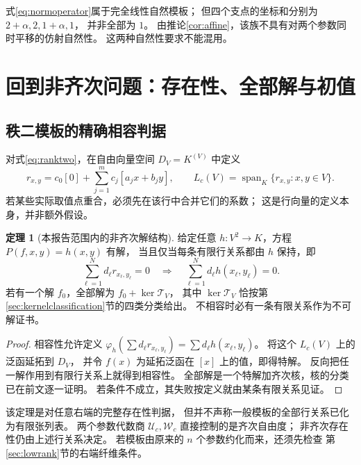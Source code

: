 \documentclass[UTF8,11pt,a4paper]{ctexart}
\theoremstyle{definition}
\newtheorem{theorem}{定理}[section]
\newcommand{\Span}{\operatorname{span}}
\newcommand{\T}{\mathcal T}
\newcommand{\Uc}{\mathscr U_c}
\newcommand{\Wc}{\mathscr W_c}
\numberwithin{equation}{section}
\begin{document}
式\eqref{eq:normoperator}属于完全线性自然模板；
但四个支点的坐标和分别为 $2+\alpha,2,1+\alpha,1$，
并非全部为 $1$。
由推论\ref{cor:affine}，该族不具有对两个参数同时平移的仿射自然性。
这两种自然性要求不能混用。

\section{回到非齐次问题：存在性、全部解与初值}\label{sec:inhomfinal}
\subsection{秩二模板的精确相容判据}
对式\eqref{eq:ranktwo}，在自由向量空间 $D_V=K^{(V)}$ 中定义
\[
 r_{x,y}=c_0[0]+\sum_{j=1}^m c_j[a_jx+b_jy],\qquad
 L_c(V)=\Span_K\{r_{x,y}:x,y\in V\}.
\]
若某些实际取值点重合，必须先在该行中合并它们的系数；
这是行向量的定义本身，并非额外假设。

\begin{theorem}[本报告范围内的非齐次解结构]\label{thm:inhomfinal}
给定任意 $h:V^2\to K$，方程 $P(f,x,y)=h(x,y)$ 有解，
当且仅当每条有限行关系都由 $h$ 保持，即
\[
 \sum_{\ell=1}^N d_\ell r_{x_\ell,y_\ell}=0
 \quad\Longrightarrow\quad
 \sum_{\ell=1}^N d_\ell h(x_\ell,y_\ell)=0.
\]
若有一个解 $f_0$，全部解为 $f_0+\ker\T_V$，
其中 $\ker\T_V$ 恰按第\ref{sec:kernelclassification}节的四类分类给出。
不相容时必有一条有限关系作为不可解证书。
\end{theorem}
\begin{proof}
相容性允许定义
$\varphi_h(\sum d_\ell r_{x_\ell,y_\ell})
=\sum d_\ell h(x_\ell,y_\ell)$。
将这个 $L_c(V)$ 上的泛函延拓到 $D_V$，
并令 $f(x)$ 为延拓泛函在 $[x]$ 上的值，即得特解。
反向把任一解作用到有限行关系上就得到相容性。
全部解是一个特解加齐次核，核的分类已在前文逐一证明。
若条件不成立，其失败按定义就由某条有限关系见证。
\end{proof}

该定理是对任意右端的完整存在性判据，
但并不声称一般模板的全部行关系已化为有限张列表。
两个参数代数商 $\Uc,\Wc$ 直接控制的是齐次自由度；
非齐次存在性仍由上述行关系决定。
若模板由原来的 $n$ 个参数约化而来，还须先检查
第\ref{sec:lowrank}节的右端纤维条件。
\end{document}
